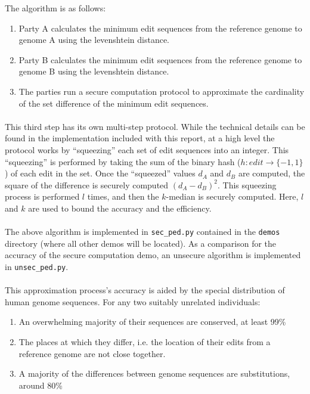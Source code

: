 The algorithm is as follows:

\begin{enumerate}
\item Party A calculates the minimum edit sequences from the reference genome to genome A using the levenshtein distance.
\item Party B calculates the minimum edit sequences from the reference genome to genome B using the levenshtein distance.
\item The parties run a secure computation protocol to approximate the cardinality of the set difference of the minimum edit sequences.
\end{enumerate}

\paragraph{}
This third step has its own multi-step protocol. While the technical details can be found in the implementation included with this report, at a high level the protocol works by ``squeezing'' each set of edit sequences into an integer. This ``squeezing'' is performed by taking the sum of the binary hash ($h : edit \rightarrow \{-1, 1\}$) of each edit in the set. Once the ``squeezed'' values $d_A$ and $d_B$ are computed, the square of the difference is securely computed $(d_A - d_B)^2$. This squeezing process is performed $l$ times, and then the $k$-median is securely computed. Here, $l$ and $k$ are used to bound the accuracy and the efficiency.

\paragraph{}
The above algorithm is implemented in \texttt{sec\_ped.py} contained in the \texttt{demos} directory (where all other demos will be located). As a comparison for the accuracy of the secure computation demo, an unsecure algorithm is implemented in \texttt{unsec\_ped.py}.

\paragraph{}
This approximation process's accuracy is aided by the special distribution of human genome sequences.\cite{naturegene} For any two suitably unrelated individuals:

\begin{enumerate}
\item An overwhelming majority of their sequences are conserved, at least 99\%
\item The places at which they differ, i.e. the location of their edits from a reference genome are not close together.
\item A majority of the differences between genome sequences are substitutions, around 80\%
\end{enumerate}


